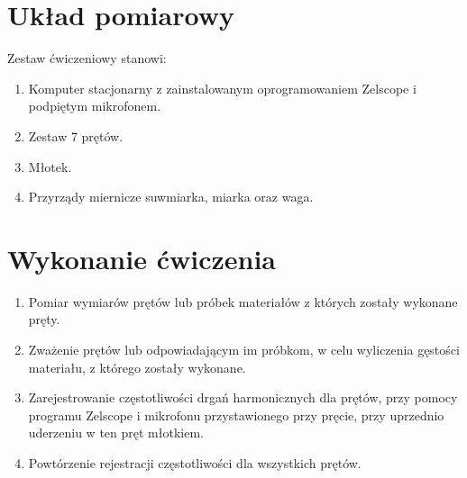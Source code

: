 \documentclass{article}
\begin{document}
	\section{Układ pomiarowy}
	Zestaw ćwiczeniowy stanowi:
	\begin{enumerate}
		\item Komputer stacjonarny z zainstalowanym oprogramowaniem Zelscope i podpiętym mikrofonem.
		\item Zestaw 7 prętów.
		\item Młotek.
		\item Przyrządy miernicze suwmiarka, miarka oraz waga.
		
	\end{enumerate}
	
	
	\section{Wykonanie ćwiczenia}
	\begin{enumerate}
		\item Pomiar wymiarów prętów lub próbek materiałów z których zostały wykonane pręty.
		\item Zważenie prętów lub odpowiadającym im próbkom, w celu wyliczenia gęstości materiału, z którego zostały wykonane.
		\item Zarejestrowanie częstotliwości drgań harmonicznych dla prętów, przy pomocy programu Zelscope i mikrofonu przystawionego przy pręcie, przy uprzednio uderzeniu w ten pręt młotkiem.
		\item Powtórzenie rejestracji częstotliwości dla wszystkich prętów.
	\end{enumerate}
	
	\pagebreak
\end{document}

